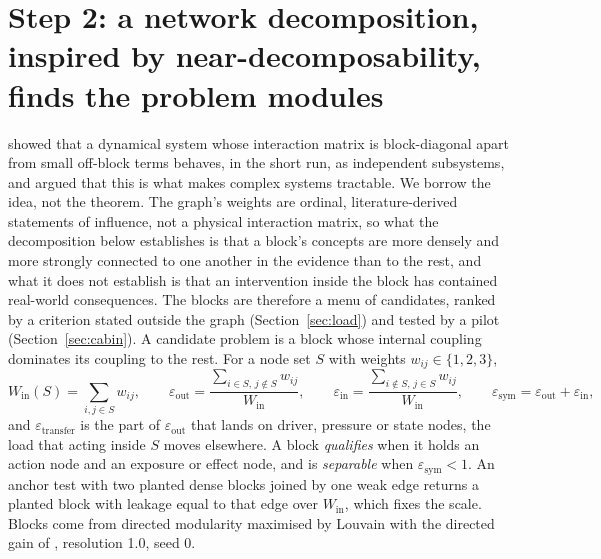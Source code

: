 \documentclass[10pt,a4paper]{article}
\newcommand{\eps}{\varepsilon}
\newcommand{\Win}{W_{\mathrm{in}}}
\begin{document}
\section{Step 2: a network decomposition, inspired by near-decomposability, finds the problem modules}\label{sec:decomp}
\citet{AndoSimon1961} showed that a dynamical system whose interaction matrix is block-diagonal apart from small off-block terms behaves, in the short run, as independent subsystems, and \citet{Simon1962} argued that this is what makes complex systems tractable. We borrow the idea, not the theorem. The graph's weights are ordinal, literature-derived statements of influence, not a physical interaction matrix, so what the decomposition below establishes is that a block's concepts are more densely and more strongly connected to one another in the evidence than to the rest, and what it does not establish is that an intervention inside the block has contained real-world consequences. The blocks are therefore a menu of candidates, ranked by a criterion stated outside the graph (Section~\ref{sec:load}) and tested by a pilot (Section~\ref{sec:cabin}). A candidate problem is a block whose internal coupling dominates its coupling to the rest. For a node set \(S\) with weights \(w_{ij}\in\{1,2,3\}\),
\begin{equation}
\Win(S)=\sum_{i,j\in S} w_{ij},\qquad
\eps_{\mathrm{out}}=\frac{\sum_{i\in S,\,j\notin S} w_{ij}}{\Win},\qquad
\eps_{\mathrm{in}}=\frac{\sum_{i\notin S,\,j\in S} w_{ij}}{\Win},\qquad
\eps_{\mathrm{sym}}=\eps_{\mathrm{out}}+\eps_{\mathrm{in}},
\end{equation}
and \(\eps_{\mathrm{transfer}}\) is the part of \(\eps_{\mathrm{out}}\) that lands on driver, pressure or state nodes, the load that acting inside \(S\) moves elsewhere. A block \emph{qualifies} when it holds an action node and an exposure or effect node, and is \emph{separable} when \(\eps_{\mathrm{sym}}<1\). An anchor test with two planted dense blocks joined by one weak edge returns a planted block with leakage equal to that edge over \(\Win\), which fixes the scale. Blocks come from directed modularity \citep{LeichtNewman2008} maximised by Louvain \citep{Blondel2008} with the directed gain of \citet{DuguePerez2015}, resolution 1.0, seed 0.
\end{document}
